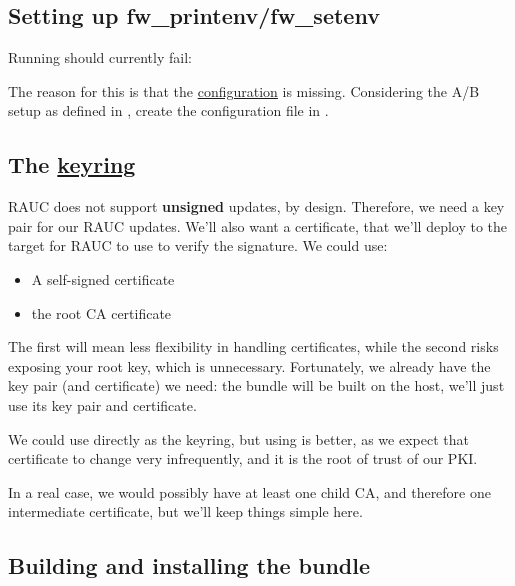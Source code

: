 \subsection{Setting up fw\_printenv/fw\_setenv}

Running  should currently fail:


The reason for this is that the \href{https://github.com/ARM-software/u-boot/blob/master/tools/env/fw_env.config}{configuration} is missing.
Considering the A/B setup as defined in , create the
configuration file in .


\subsection{The \href{https://rauc.readthedocs.io/en/latest/reference.html\#keyring-section}{keyring}}

RAUC does not support \textbf{unsigned} updates, by design. Therefore, we need a key pair for our RAUC updates.
We'll also want a certificate, that we'll deploy to the target for RAUC to use to verify the signature.
We could use:
\begin{itemize}
  \item A self-signed certificate
  \item the root CA certificate
\end{itemize}

The first will mean less flexibility in handling certificates, while the second risks exposing
your root key, which is unnecessary.
Fortunately, we already have the key pair (and certificate) we need: the bundle will be built on the host,
we'll just use its key pair and certificate.

We could use  directly as the keyring, but using  is better, as we expect
that certificate to change very infrequently, and it is the root of trust of our PKI.

In a real case, we would possibly have at least one child CA, and therefore one intermediate certificate,
but we'll keep things simple here.

\subsection{Building and installing the bundle}

